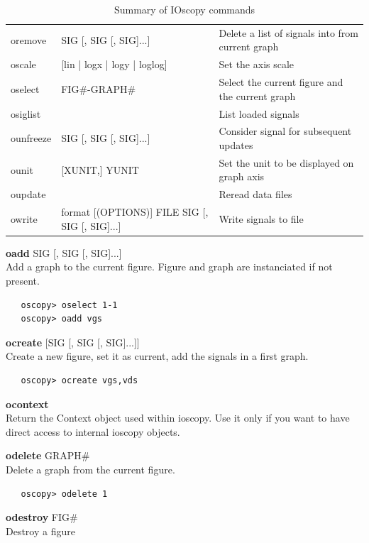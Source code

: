 \documentclass[a4paper,11pt]{article}
\begin{document}
\begin{landscape}
\begin{table}[htbp]
\begin{tabular}{lll}
      oremove & SIG [, SIG [, SIG]...] &Delete a list of signals into from current graph\\
      oscale & [lin | logx | logy | loglog] &Set the axis scale\\
      oselect & FIG\#-GRAPH\# &Select the current figure and the current graph\\
      osiglist & &List loaded signals\\
      ounfreeze & SIG [, SIG [, SIG]...] &Consider signal for subsequent updates\\
      ounit & [XUNIT,] YUNIT &Set the unit to be displayed on graph axis\\
      oupdate & &Reread data files\\
      owrite & format [(OPTIONS)] FILE SIG [, SIG [, SIG]...] &Write signals to file\\
      \hline
    \end{tabular}
    \caption{Summary of IOscopy commands}
    \label{tab:cmds:summary}
  \end{table}
\end{landscape}

\newcommand{\ocmd}[2]{{\large\vspace{5mm}\noindent\textbf{#1} #2\\}}

\ocmd{oadd}{SIG [, SIG [, SIG]...]}
   Add a graph to the current figure. Figure and graph are instanciated if not present.

\begin{verbatim}
   oscopy> oselect 1-1
   oscopy> oadd vgs
\end{verbatim}

\ocmd{ocreate}{[SIG [, SIG [, SIG]...]]}
   Create a new figure, set it as current, add the signals in a first graph.

\begin{verbatim}
   oscopy> ocreate vgs,vds
\end{verbatim}

\ocmd{ocontext}{\ }
   Return the Context object used within ioscopy.
 Use it only if you want to have direct access to internal ioscopy objects.

\ocmd{odelete}{GRAPH\#}
   Delete a graph from the current figure.

\begin{verbatim}
   oscopy> odelete 1
\end{verbatim}

\ocmd{odestroy}{FIG\#}
   Destroy a figure
\end{document}
